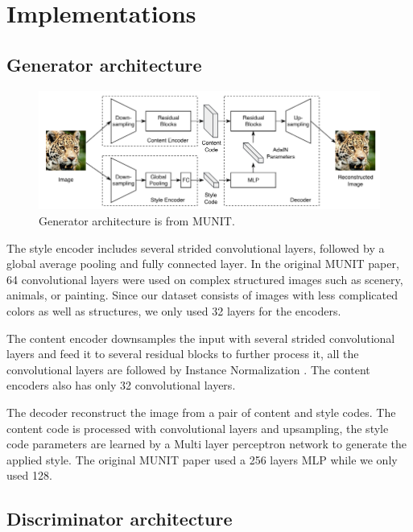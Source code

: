 \documentclass[12pt]{report}
\begin{document}
\section{Implementations}
\subsection{Generator architecture}
\begin{figure}[h]
	\centering
	\includegraphics[scale=0.8]{gen-architecture}
	\caption{Generator architecture is from MUNIT\cite{munit}.}
	\label{fig:vae-architecture}
\end{figure}

The style encoder includes several strided convolutional layers, followed by a global average pooling and fully connected layer. In the original MUNIT paper, 64 convolutional layers were used on complex structured images such as scenery, animals, or painting. Since our dataset consists of images with less complicated colors as well as structures, we only used 32 layers for the encoders.

The content encoder downsamples the input with several strided convolutional layers and feed it to several residual blocks \cite{resnet} to further process it, all the convolutional layers are followed by Instance Normalization \cite{instance-norm}. The content encoders also has only 32 convolutional layers.

The decoder reconstruct the image from a pair of content and style codes. The content code is processed with convolutional layers and upsampling, the style code parameters are learned by a Multi layer perceptron \cite{mlp} network to generate the applied style. The original MUNIT paper\cite{munit} used a 256 layers MLP while we only used 128.

\subsection{Discriminator architecture}
\end{document}
